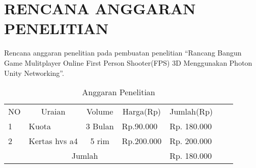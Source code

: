 \chapter*{RENCANA ANGGARAN PENELITIAN}
Rencana anggaran penelitian pada pembuatan penelitian “Rancang Bangun Game Mulitplayer Online First Person Shooter(FPS) 3D Menggunakan Photon Unity Networking”.

\begin{table}[h]
    \centering
    \begin{tabular}{|llcl|l|ll}
    \cline{1-5}
    \multicolumn{1}{|c|}{NO} & \multicolumn{1}{c|}{Uraian}          & \multicolumn{1}{c|}{Volume}  & \multicolumn{1}{c|}{Harga(Rp)} & Jumlah(Rp)    &  &  \\ \cline{1-5}
    \multicolumn{1}{|l|}{1}  & \multicolumn{1}{l|}{Kuota}           & \multicolumn{1}{c|}{3 Bulan} & Rp.90.000                      & Rp. 180.000   &  &  \\ \cline{1-5}
    \multicolumn{1}{|l|}{2}  & \multicolumn{1}{l|}{Kertas hvs a4}           & \multicolumn{1}{c|}{5 rim} & Rp.200.000                      & Rp. 200.000   &  &  \\ \cline{1-5}
    \multicolumn{4}{|c|}{Jumlah}                                                                                                    & Rp. 180.000 &  &  \\ \cline{1-5}
    \end{tabular}
    \caption{Anggaran Penelitian}
    \label{lab:label-anggaran}
    \end{table}